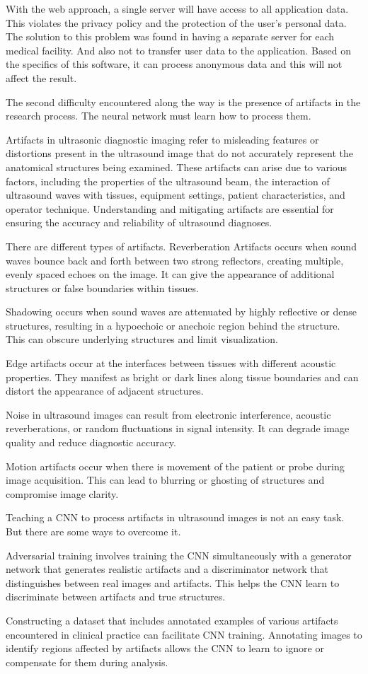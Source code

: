 \documentclass[a4paper,10pt,twocolumn]{article}
\begin{document}
With the web approach, a single server will have
access to all application data. This violates the privacy policy and the protection of the user’s personal data. The
solution to this problem was found in having a separate
server for each medical facility. And also not to transfer
user data to the application. Based on the specifics of this
software, it can process anonymous data and this will not
affect the result.

The second difficulty encountered along the way is the
presence of artifacts in the research process. The neural
network must learn how to process them.

Artifacts in ultrasonic diagnostic imaging refer to misleading features or distortions present in the ultrasound
image that do not accurately represent the anatomical
structures being examined. These artifacts can arise
due to various factors, including the properties of the
ultrasound beam, the interaction of ultrasound waves
with tissues, equipment settings, patient characteristics,
and operator technique. Understanding and mitigating
artifacts are essential for ensuring the accuracy and
reliability of ultrasound diagnoses.

There are different types of artifacts. Reverberation
Artifacts occurs when sound waves bounce back and
forth between two strong reflectors, creating multiple,
evenly spaced echoes on the image. It can give the
appearance of additional structures or false boundaries
within tissues.

Shadowing occurs when sound waves are attenuated
by highly reflective or dense structures, resulting in a
hypoechoic or anechoic region behind the structure. This
can obscure underlying structures and limit visualization.

Edge artifacts occur at the interfaces between tissues
with different acoustic properties. They manifest as bright
or dark lines along tissue boundaries and can distort the
appearance of adjacent structures.

Noise in ultrasound images can result from electronic
interference, acoustic reverberations, or random fluctuations in signal intensity. It can degrade image quality and
reduce diagnostic accuracy.

Motion artifacts occur when there is movement of the
patient or probe during image acquisition. This can lead
to blurring or ghosting of structures and compromise
image clarity.

Teaching a CNN to process artifacts in ultrasound
images is not an easy task. But there are some ways
to overcome it.

Adversarial training involves training the CNN simultaneously with a generator network that generates realistic
artifacts and a discriminator network that distinguishes
between real images and artifacts. This helps the CNN
learn to discriminate between artifacts and true structures.

Constructing a dataset that includes annotated examples of various artifacts encountered in clinical practice
can facilitate CNN training. Annotating images to identify regions affected by artifacts allows the CNN to learn
to ignore or compensate for them during analysis.
\end{document}
